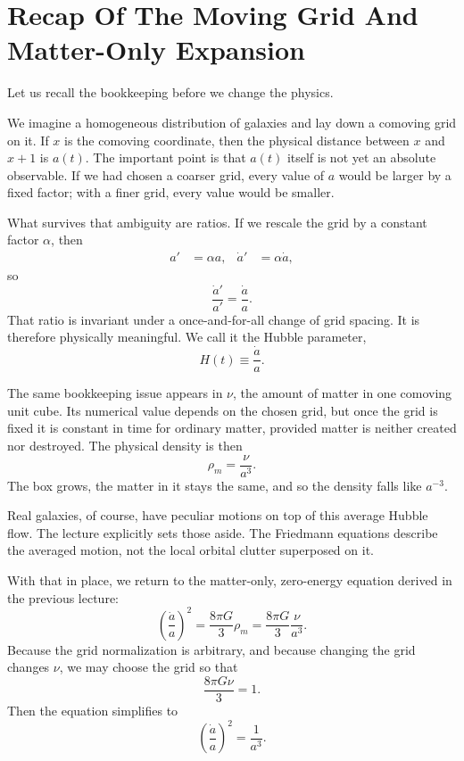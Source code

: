 \section{Recap Of The Moving Grid And Matter-Only Expansion}

Let us recall the bookkeeping before we change the physics.

We imagine a homogeneous distribution of galaxies and lay down a comoving grid on it. If \(x\) is the comoving coordinate, then the physical distance between \(x\) and \(x+1\) is \(a(t)\). The important point is that \(a(t)\) itself is not yet an absolute observable. If we had chosen a coarser grid, every value of \(a\) would be larger by a fixed factor; with a finer grid, every value would be smaller.

What survives that ambiguity are ratios. If we rescale the grid by a constant factor \(\alpha\), then
\begin{align}
a' &= \alpha a, &
\dot a' &= \alpha \dot a,
\end{align}
so
\begin{equation}
\frac{\dot a'}{a'}=\frac{\dot a}{a}.
\end{equation}
That ratio is invariant under a once-and-for-all change of grid spacing. It is therefore physically meaningful. We call it the Hubble parameter,
\begin{equation}
H(t)\equiv \frac{\dot a}{a}.
\end{equation}

The same bookkeeping issue appears in \(\nu\), the amount of matter in one comoving unit cube. Its numerical value depends on the chosen grid, but once the grid is fixed it is constant in time for ordinary matter, provided matter is neither created nor destroyed. The physical density is then
\begin{equation}
\rho_m=\frac{\nu}{a^3}.
\end{equation}
The box grows, the matter in it stays the same, and so the density falls like \(a^{-3}\).

Real galaxies, of course, have peculiar motions on top of this average Hubble flow. The lecture explicitly sets those aside. The Friedmann equations describe the averaged motion, not the local orbital clutter superposed on it.

With that in place, we return to the matter-only, zero-energy equation derived in the previous lecture:
\begin{equation}
\left(\frac{\dot a}{a}\right)^2=\frac{8\pi G}{3}\rho_m
=\frac{8\pi G}{3}\frac{\nu}{a^3}.
\end{equation}
Because the grid normalization is arbitrary, and because changing the grid changes \(\nu\), we may choose the grid so that
\begin{equation}
\frac{8\pi G\nu}{3}=1.
\end{equation}
Then the equation simplifies to
\begin{equation}
\left(\frac{\dot a}{a}\right)^2=\frac{1}{a^3}.
\end{equation}

